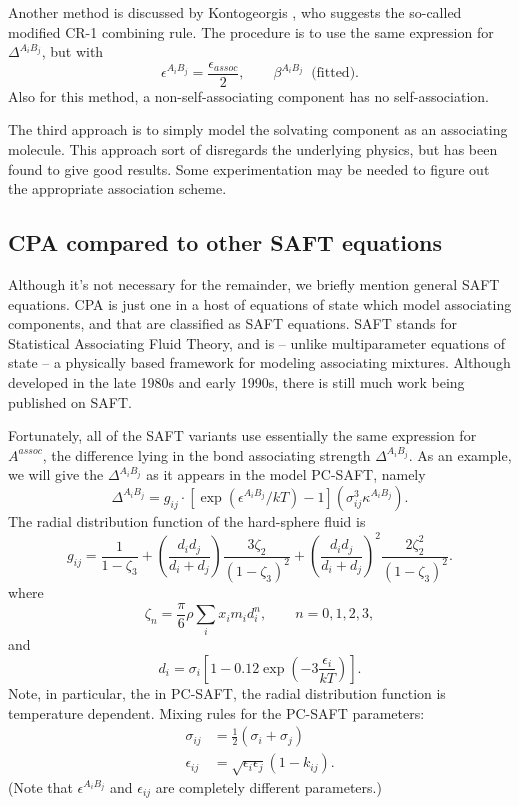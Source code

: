 \documentclass[10pt, a4paper]{article}
\newcommand{\z}{\zeta}
\newcommand{\lp}{\left(}
\newcommand{\rp}{\right)}
\begin{document}
Another method is discussed by Kontogeorgis \cite{Kontogeorgis10}, who suggests the so-called modified CR-1 combining rule. The procedure is to use the same expression for $\Delta^{A_i B_j}$, but with
\begin{equation}
  \epsilon^{A_i B_j} = \frac{\epsilon_{assoc}}{2}, \qquad \beta^{A_i B_j} \ \text{ (fitted)}.
\end{equation}
Also for this method, a non-self-associating component has no self-association.

The third approach is to simply model the solvating component as an associating molecule. This approach sort of disregards the underlying physics, but has been found to give good results. Some experimentation may be needed to figure out the appropriate association scheme. %


\subsection{CPA compared to other SAFT equations}
Although it's not necessary for the remainder, we briefly mention general SAFT equations. CPA is just one in a host of equations of state which model associating components, and that are classified as SAFT equations. SAFT stands for Statistical Associating Fluid Theory, and is -- unlike multiparameter equations of state -- a physically based framework for modeling associating mixtures. Although developed in the late 1980s and early 1990s, there is still much work being published on SAFT.

Fortunately, all of the SAFT variants use essentially the same expression for $A^{assoc}$, the difference lying in the bond associating strength $\Delta^{A_i B_j}$. As an example, we will give the $\Delta^{A_i B_j}$ as it appears in the model PC-SAFT, namely
\begin{equation}
  \label{ascStrength}
  \Delta^{A_i B_j} = g_{ij} \cdot [\exp(\epsilon^{A_i B_j}/kT) - 1](\sigma_{ij}^3 \kappa^{A_i B_j}).
\end{equation}
The radial distribution function of the hard-sphere fluid is
\begin{equation}
  \label{gij}
  g_{ij} = \frac{1}{1-\z_3} + \lp \frac{d_id_j}{d_i+d_j} \rp \frac{3\z_2}{(1-\z_3)^2} + \lp \frac{d_i d_j}{d_i+d_j} \rp^2 \frac{2\z_2^2}{(1-\z_3)^2}.
\end{equation}
where
\begin{equation}
  \z_n = \frac{\pi}{6} \rho \sum_i x_i m_i d_i^n, \qquad n = 0,1,2,3,
\end{equation}
and
\begin{equation}
  d_i = \sigma_i \left[1 - 0.12\exp \lp -3\frac{\epsilon_i}{kT} \rp \right].
\end{equation}
Note, in particular, the in PC-SAFT, the radial distribution function is temperature dependent. Mixing rules for the PC-SAFT parameters:
\begin{align}
  \sigma_{ij} &= \frac{1}{2}(\sigma_i + \sigma_j) \\
  \epsilon_{ij} &= \sqrt{\epsilon_i \epsilon_j}(1-k_{ij}).
\end{align}
(Note that $\epsilon^{A_i B_j}$ and $\epsilon_{ij}$ are completely different parameters.)
\end{document}
